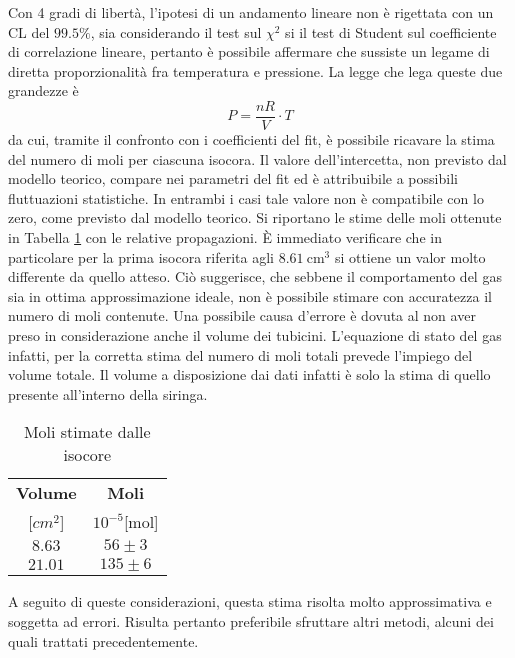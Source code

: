 \documentclass[a4paper,11pt,oneside]{article}
\begin{document}
\newpage
Con 4 gradi di libertà, l'ipotesi di un andamento lineare non è rigettata con un CL del $99.5\%$, sia considerando il test sul $\chi^{2}$ si il test di Student sul coefficiente di correlazione lineare, pertanto è possibile  affermare che sussiste un legame di diretta proporzionalità fra temperatura e pressione.
La legge che lega queste due grandezze è
\begin{equation*}
    P=\frac{nR}{V}\cdot T
\end{equation*}
da cui, tramite il confronto con i coefficienti del fit, è possibile ricavare la stima del numero di moli per ciascuna isocora. Il valore dell'intercetta, non previsto dal modello teorico, compare nei parametri del fit ed è attribuibile a possibili fluttuazioni statistiche. In entrambi i casi tale valore non è compatibile con lo zero, come previsto dal modello teorico.
Si riportano le stime delle moli ottenute in Tabella \ref{tab:moli_isocore} con le relative propagazioni. È immediato verificare che in particolare per la prima isocora riferita agli $\SI{8.61}{\centi\meter\cubed}$ si ottiene un valor molto differente da quello atteso. Ciò suggerisce, che sebbene il comportamento del gas sia in ottima approssimazione ideale, non è possibile stimare con accuratezza il numero di moli contenute. Una possibile causa d'errore è dovuta al non aver preso in considerazione anche il volume dei tubicini. L'equazione di stato del gas infatti, per la corretta stima del numero di moli totali prevede l'impiego del volume totale. Il volume a disposizione dai dati infatti è solo la stima di quello presente all'interno della siringa.

\begin{table}[h!]
    \centering
    \begin{tabular}{|c|c|}
        \hline
        \textbf{Volume} & \textbf{Moli} \\
        \si{[$cm^2$]} & $10^{-5}$[mol] \\ \hline
        \rowcolor[rgb]{0.85,0.85,0.85}$8.63$ & $56\pm3$\\ \hline
        $21.01$ & $135\pm6$\\ \hline
    \end{tabular}
    \caption{Moli stimate dalle isocore}
    \label{tab:moli_isocore}
\end{table}


A seguito di queste considerazioni, questa stima risolta molto approssimativa e soggetta ad errori. Risulta pertanto preferibile sfruttare altri metodi, alcuni dei quali trattati precedentemente.
\end{document}
